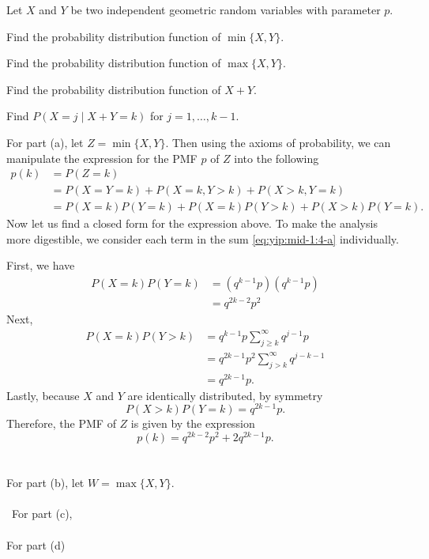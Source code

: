 \begin{problem}
  Let \(X\) and \(Y\) be two independent geometric random variables with
  parameter \(p\).
  \begin{alphlist}
  \item Find the probability distribution function of \(\min\{X,Y\}\).
  \item Find the probability distribution function of \(\max\{X,Y\}\).
  \item Find the probability distribution function of \(X+Y\).
  \item Find \(P(X=j\mid X+Y=k)\) for \(j=1,\dotsc,k-1\).
  \end{alphlist}
\end{problem}
\begin{solution*}
  For part (a), let \(Z=\min\{X,Y\}\). Then using the axioms of
  probability, we can manipulate the expression for the PMF \(p\) of \(Z\)
  into the following
  \begin{equation}
    \label{eq:yip:mid-1:4-a}
    \begin{aligned}
      p(k)
      &=P(Z=k)\\
      &=P(X=Y=k)+P(X=k,Y>k)+P(X>k,Y=k)\\
      &=P(X=k)P(Y=k)+P(X=k)P(Y>k)+P(X>k)P(Y=k).
    \end{aligned}
  \end{equation}
  Now let us find a closed form for the expression above. To make the
  analysis more digestible, we consider each term in the sum
  \eqref{eq:yip:mid-1:4-a} individually.

  First, we have
  \begin{align*}
    P(X=k)P(Y=k)
    &=(q^{k-1}p)(q^{k-1}p)\\
    &=q^{2k-2}p^2
  \end{align*}
  Next,
  \begin{align*}
    P(X=k)P(Y>k)
    &=q^{k-1}p\sum_{j\geq k}^\infty q^{j-1}p\\
    &=q^{2k-1}p^2\sum_{j>k}^\infty q^{j-k-1}\\
    &=q^{2k-1}p.
  \end{align*}
  Lastly, because \(X\) and \(Y\) are identically distributed, by symmetry
  \[
    P(X>k)P(Y=k)=q^{2k-1}p.
  \]
  Therefore, the PMF of \(Z\) is given by the expression
  \[
    p(k)=q^{2k-2}p^2+2q^{2k-1}p.
  \]
  \\\\
  For part (b), let \(W=\max\{X,Y\}\).
  \\\\\
  For part (c),
  \\\\
  For part (d)
\end{solution*}

